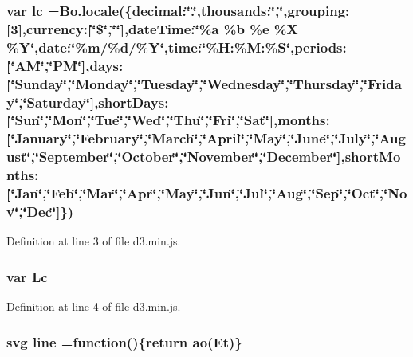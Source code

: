 \subsubsection[{lc}]{\setlength{\rightskip}{0pt plus 5cm}var lc ={\bf Bo.\+locale}(\{decimal\+:\char`\"{}.\char`\"{},thousands\+:\char`\"{},\char`\"{},grouping\+:[3],currency\+:[\char`\"{}\$\char`\"{},\char`\"{}\char`\"{}],date\+Time\+:\char`\"{}\%a \%{\bf b} \%{\bf e} \%X \%Y\char`\"{},date\+:\char`\"{}\%m/\%{\bf d}/\%Y\char`\"{},time\+:\char`\"{}\%H\+:\%M\+:\%S\char`\"{},periods\+:[\char`\"{}A\+M\char`\"{},\char`\"{}P\+M\char`\"{}],days\+:[\char`\"{}Sunday\char`\"{},\char`\"{}Monday\char`\"{},\char`\"{}Tuesday\char`\"{},\char`\"{}Wednesday\char`\"{},\char`\"{}Thursday\char`\"{},\char`\"{}Friday\char`\"{},\char`\"{}Saturday\char`\"{}],short\+Days\+:[\char`\"{}Sun\char`\"{},\char`\"{}Mon\char`\"{},\char`\"{}Tue\char`\"{},\char`\"{}Wed\char`\"{},\char`\"{}Thu\char`\"{},\char`\"{}Fri\char`\"{},\char`\"{}Sat\char`\"{}],months\+:[\char`\"{}January\char`\"{},\char`\"{}February\char`\"{},\char`\"{}March\char`\"{},\char`\"{}April\char`\"{},\char`\"{}May\char`\"{},\char`\"{}June\char`\"{},\char`\"{}July\char`\"{},\char`\"{}August\char`\"{},\char`\"{}September\char`\"{},\char`\"{}October\char`\"{},\char`\"{}November\char`\"{},\char`\"{}December\char`\"{}],short\+Months\+:[\char`\"{}Jan\char`\"{},\char`\"{}Feb\char`\"{},\char`\"{}Mar\char`\"{},\char`\"{}Apr\char`\"{},\char`\"{}May\char`\"{},\char`\"{}Jun\char`\"{},\char`\"{}Jul\char`\"{},\char`\"{}Aug\char`\"{},\char`\"{}Sep\char`\"{},\char`\"{}Oct\char`\"{},\char`\"{}Nov\char`\"{},\char`\"{}Dec\char`\"{}]\})}\label{d3_8min_8js_a57e1ea504f03daee917d0e04d295e5f6}


Definition at line 3 of file d3.\+min.\+js.

\subsubsection[{Lc}]{\setlength{\rightskip}{0pt plus 5cm}var Lc}\label{d3_8min_8js_a45614ac3b9236997b91d5f6166b6ec94}


Definition at line 4 of file d3.\+min.\+js.

\subsubsection[{line}]{ {\bf svg} line =function()\{{\bf return} {\bf ao}(Et)\}}\label{d3_8min_8js_a56264ff153761d76c3dc9f52bba6e045}


